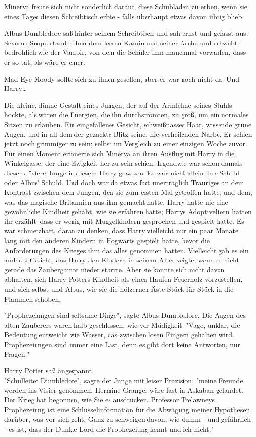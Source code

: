 {Minerva freute sich nicht sonderlich darauf, diese Schubladen zu erben, wenn sie eines Tages diesen Schreibtisch erbte - falls überhaupt etwas davon übrig blieb.

Albus Dumbledore saß hinter seinem Schreibtisch und sah ernst und gefasst aus. Severus Snape stand neben dem leeren Kamin und seiner Asche und schwebte bedrohlich wie der Vampir, von dem die Schüler ihm manchmal vorwarfen, dass er so tat, als wäre er einer.

Mad-Eye Moody sollte sich zu ihnen gesellen, aber er war noch nicht da. Und Harry…

Die kleine, dünne Gestalt eines Jungen, der auf der Armlehne seines Stuhls hockte, als wären die Energien, die ihn durchströmten, zu groß, um ein normales Sitzen zu erlauben. Ein eingefallenes Gesicht, schweißnasses Haar, wissende grüne Augen, und in all dem der gezackte Blitz seiner nie verheilenden Narbe. Er schien jetzt noch grimmiger zu sein; selbst im Vergleich zu einer einzigen Woche zuvor. Für einen Moment erinnerte sich Minerva an ihren Ausflug mit Harry in die Winkelgasse, der eine Ewigkeit her zu sein schien. Irgendwie war schon damals dieser düstere Junge in diesem Harry gewesen. Es war nicht allein ihre Schuld oder Albus' Schuld. Und doch war da etwas fast unerträglich Trauriges an dem Kontrast zwischen dem Jungen, den sie zum ersten Mal getroffen hatte, und dem, was das magische Britannien aus ihm gemacht hatte. Harry hatte nie eine gewöhnliche Kindheit gehabt, wie sie erfahren hatte; Harrys Adoptiveltern hatten ihr erzählt, dass er wenig mit Muggelkindern gesprochen und gespielt hatte. Es war schmerzhaft, daran zu denken, dass Harry vielleicht nur ein paar Monate lang mit den anderen Kindern in Hogwarts gespielt hatte, bevor die Anforderungen des Krieges ihm das alles genommen hatten. Vielleicht gab es ein anderes Gesicht, das Harry den Kindern in seinem Alter zeigte, wenn er nicht gerade das Zaubergamot nieder starrte. Aber sie konnte sich nicht davon abhalten, sich Harry Potters Kindheit als einen Haufen Feuerholz vorzustellen, und sich selbst und Albus, wie sie die hölzernen Äste Stück für Stück in die Flammen schoben.

"Prophezeiungen sind seltsame Dinge", sagte Albus Dumbledore. Die Augen des alten Zauberers waren halb geschlossen, wie vor Müdigkeit. "Vage, unklar, die Bedeutung entweicht wie Wasser, das zwischen losen Fingern gehalten wird. Prophezeiungen sind immer eine Last, denn es gibt dort keine Antworten, nur Fragen."

Harry Potter saß angespannt.\\ "Schulleiter Dumbledore", sagte der Junge mit leiser Präzision, "meine Freunde werden ins Visier genommen. Hermine Granger wäre fast in Askaban gelandet. Der Krieg hat begonnen, wie Sie es ausdrücken. Professor Trelawneys Prophezeiung ist eine Schlüsselinformation für die Abwägung meiner Hypothesen darüber, was vor sich geht. Ganz zu schweigen davon, wie dumm - und gefährlich - es ist, dass der Dunkle Lord die Prophezeiung kennt und ich nicht."

}
